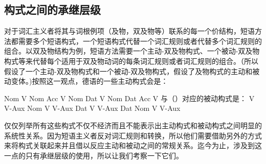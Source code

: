 \begin{exe}
\begin{xlist}[iv.]
\begin{exe}
\begin{xlist}[iv.]
\subsection{构式之间的承继层级}
\label{inheritance-sec}
\label{Abschnitt-Croft}

对于词汇主义者将其与词根例项（及物，双及物等）联系的每一个价结构，短语方法都需要多个短语构式，一个短语构式代替一个词汇规则或者代替多个词汇规则的组合。以双及物结构为例，短语方法需要一个主动-双及物构式、一个被动-双及物构式等来代替每个适用于双及物动词的每条词汇规则或者词汇规则的组合。（所以假设了一个主动-双及物构式和一个被动-双及物构式，假设了及物构式的主动和被动变体。)按照这一观点，德语的一些主动构式会是：

\eal
\label{ex-active-valence}
\ex {}Nom V
\ex {}Nom Acc V
\ex {}Nom Dat V
\ex {}Nom Dat Acc V
\zl 
与（）对应的被动构式是：
\eal
\label{ex-passive-valence}
\ex {}V V-Aux
\ex {}Nom V V-Aux
\ex {}Dat V V-Aux
\ex {}Dat Nom V V-Aux
\zl  

\noindent
仅仅列举所有这些构式不仅不经济而且不能表示出主动构式和被动构式之间明显的系统性关系。因为短语主义者反对词汇规则和转换，所以他们需要借助另外的方式来将构式关联起来并且借以反应主动和被动之间的常规关系。迄今为止，涉及到这一点的只有承继层级的使用，所以让我们考察一下它们。


\end{xlist}
\end{exe}
\end{xlist}
\end{exe}
